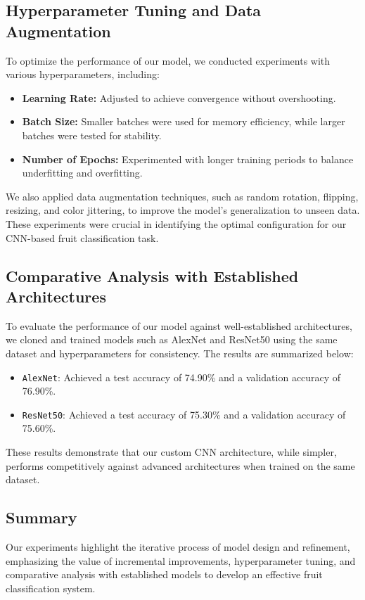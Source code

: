 \documentclass{article}
\begin{document}
\subsection{Hyperparameter Tuning and Data Augmentation}
To optimize the performance of our model, we conducted experiments with various hyperparameters, including:
\begin{itemize}
    \item \textbf{Learning Rate:} Adjusted to achieve convergence without overshooting.
    \item \textbf{Batch Size:} Smaller batches were used for memory efficiency, while larger batches were tested for stability.
    \item \textbf{Number of Epochs:} Experimented with longer training periods to balance underfitting and overfitting.
\end{itemize}

We also applied data augmentation techniques, such as random rotation, flipping, resizing, and color jittering, to improve the model's generalization to unseen data. These experiments were crucial in identifying the optimal configuration for our CNN-based fruit classification task.

\subsection{Comparative Analysis with Established Architectures}
To evaluate the performance of our model against well-established architectures, we cloned and trained models such as AlexNet and ResNet50 using the same dataset and hyperparameters for consistency. The results are summarized below:
\begin{itemize}
    \item \texttt{AlexNet}: Achieved a test accuracy of 74.90\% and a validation accuracy of 76.90\%.
    \item \texttt{ResNet50}: Achieved a test accuracy of 75.30\% and a validation accuracy of 75.60\%.
\end{itemize}

These results demonstrate that our custom CNN architecture, while simpler, performs competitively against advanced architectures when trained on the same dataset. 

\subsection{Summary}
Our experiments highlight the iterative process of model design and refinement, emphasizing the value of incremental improvements, hyperparameter tuning, and comparative analysis with established models to develop an effective fruit classification system.
\end{document}
